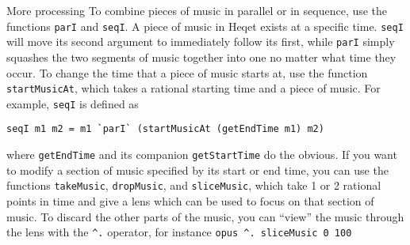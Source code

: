 \documentclass{article}
\begin{document}
\begin{section}{More processing}
To combine pieces of music in parallel or in sequence, use the functions \verb+parI+ and \verb+seqI+. A piece of music in Heqet exists at a specific time. \verb+seqI+ will move its second argument to immediately follow its first, while \verb+parI+ simply squashes the two segments of music together into one no matter what time they occur. To change the time that a piece of music starts at, use the function \verb+startMusicAt+, which takes a rational starting time and a piece of music. For example, \verb+seqI+ is defined as

\begin{verbatim}
seqI m1 m2 = m1 `parI` (startMusicAt (getEndTime m1) m2)
\end{verbatim}

where \verb+getEndTime+ and its companion \verb+getStartTime+ do the obvious. If you want to modify a section of music specified by its start or end time, you can use the functions \verb+takeMusic+, \verb+dropMusic+, and \verb+sliceMusic+, which take 1 or 2 rational points in time and give a lens which can be used to focus on that section of music. To discard the other parts of the music, you can ``view'' the music through the lens with the \verb+^.+ operator, for instance \verb+opus ^. sliceMusic 0 100+
\end{section}
\end{document}
